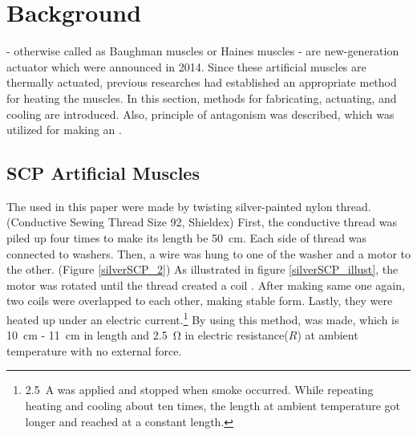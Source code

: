 \section{Background} \label{section_background}


\scps - otherwise called as Baughman muscles or Haines muscles - are new-generation actuator which were announced in 2014.
Since these artificial muscles are thermally actuated, previous researches had established an appropriate method for heating the muscles.
In this section, methods for fabricating, actuating, and cooling \scps are introduced.
Also, principle of antagonism was described, which was utilized for making an \antanospace.

\subsection{SCP Artificial Muscles}
The \scps used in this paper were made by twisting silver-painted nylon thread. (Conductive Sewing Thread Size 92, Shieldex)%
First, the conductive thread was piled up four times to make its length be \SI{50}{\centi\meter}. Each side of thread was connected to washers. Then, a wire was hung to one of the washer and a motor to the other. (Figure \ref{silverSCP_2})
As illustrated in figure \ref{silverSCP_illust}, the motor was rotated until the thread created a coil \cite{fab_coil}. After making same one again, two coils were overlapped to each other, making stable form. 
Lastly, they were heated up under an electric current.\footnote{\SI{2.5}{\ampere} was applied and stopped when smoke occurred. While repeating heating and cooling about ten times, the length at ambient temperature got longer and reached at a constant length.} By using this method, \scp was made, which is \SI{10}{\centi\meter} - \SI{11}{\centi\meter} in length and \SI{2.5}{\ohm} in electric resistance($ R $) at ambient temperature with no external force.



